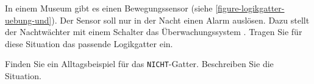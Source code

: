 \vspace{-0.75cm}

\begin{exercise}\label{uebung-sensor}
In einem Museum gibt es einen Bewegungssensor (siehe \autoref{figure-logikgatter-uebung-und}). Der Sensor soll nur in der Nacht einen Alarm auslösen. Dazu stellt der Nachtwächter mit einem Schalter das Überwachungssystem . Tragen Sie für diese Situation das passende Logikgatter ein.
\end{exercise}

\begin{exercise}
Finden Sie ein Alltagsbeispiel für das \texttt{NICHT}-Gatter. Beschreiben Sie die Situation.


\end{exercise}
